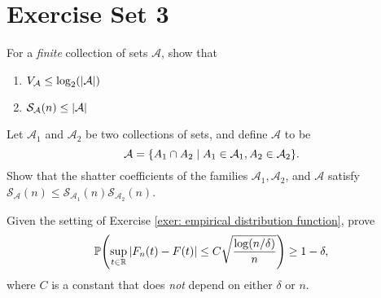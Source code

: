 \section{Exercise Set 3}

\begin{exercise}
For a \emph{finite} collection of sets $\mathcal{A}$, show that
\begin{enumerate}
    \item $V_{\mathcal{A}} \leq \log_2(\abs{\mathcal{A}})$

    \item $\mathcal{S}_{\mathcal{A}}(n) \leq \abs{\mathcal{A}}$
\end{enumerate}
\end{exercise}


\begin{exercise}
Let $\mathcal{A}_1$ and $\mathcal{A}_2$ be two collections of sets, and define $\mathcal{A}$ to be
\[
    \mathcal{A} = \set{A_1 \cap A_2 \with A_1 \in \mathcal{A}_1, A_2 \in \mathcal{A}_2}.
\]
Show that the shatter coefficients of the families $\mathcal{A}_1, \mathcal{A}_2$, and $\mathcal{A}$ satisfy $\mathcal{S}_{\mathcal{A}}(n) \leq \mathcal{S}_{\mathcal{A}_1}(n) \mathcal{S}_{\mathcal{A}_2}(n)$.
\end{exercise}


\begin{exercise}
Given the setting of Exercise \ref{exer: empirical distribution function}, prove
\[
    \P\left(\sup_{t \in \R} \abs{F_n(t) - F(t)} \leq C \sqrt{\frac{\log(n / \delta)}{n}}\right) \geq 1 - \delta,
\]
where $C$ is a constant that does \emph{not} depend on either $\delta$ or $n$.
\end{exercise}
